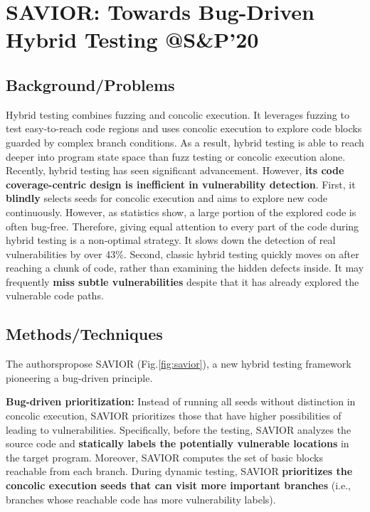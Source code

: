 \maketitle 
\tableofcontents
\clearpage

\twocolumn
\section{SAVIOR: Towards Bug-Driven Hybrid Testing @S\&P'20
}
\subsection{Background/Problems}
Hybrid testing combines fuzzing and concolic
execution. It leverages fuzzing to test easy-to-reach code
regions and uses concolic execution to explore code blocks
guarded by complex branch conditions. As a result, hybrid testing
is able to reach deeper into program state space than fuzz
testing or concolic execution alone. Recently, hybrid testing has
seen significant advancement. However, \textbf{its code coverage-centric
design is inefficient in vulnerability detection}. First, it \textbf{blindly}
selects seeds for concolic execution and aims to explore new code
continuously. However, as statistics show, a large portion of the
explored code is often bug-free. Therefore, giving equal attention
to every part of the code during hybrid testing is a non-optimal
strategy. It slows down the detection of real vulnerabilities by
over 43\%. Second, classic hybrid testing quickly moves on after
reaching a chunk of code, rather than examining the hidden
defects inside. It may frequently \textbf{miss subtle vulnerabilities}
despite that it has already explored the vulnerable code paths.
\subsection{Methods/Techniques}
The authorspropose SAVIOR (Fig.\ref{fig:savior}), a new hybrid testing framework pioneering
a bug-driven principle.

\textbf{Bug-driven prioritization:} Instead of running all seeds without
distinction in concolic execution, SAVIOR prioritizes
those that have higher possibilities of leading to vulnerabilities.
Specifically, before the testing, SAVIOR analyzes the source
code and \textbf{statically labels the potentially vulnerable locations}
in the target program.
Moreover, SAVIOR computes the set of basic blocks reachable
from each branch. During dynamic testing, SAVIOR \textbf{prioritizes the concolic execution seeds that can visit more
important branches} (i.e., branches whose reachable code has
more vulnerability labels).


